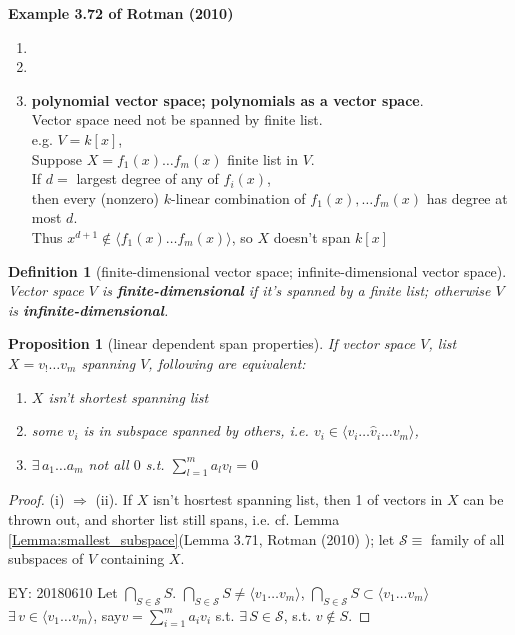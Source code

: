 \documentclass[10pt]{amsart}
\newtheorem{proposition}{Proposition}
\newtheorem{definition}{Definition}
\begin{document}
\begin{multicols*}{2}
\textbf{Example 3.72 of Rotman (2010) \cite{JRotman2010}}
\begin{enumerate}
	\item[(i)]
	\item[(ii)]
	\item[(iii)] \textbf{polynomial vector space; polynomials as a vector space}.  \\
	Vector space need not be spanned by finite list. \\
	e.g. $V=k[x]$, \\
	Suppose $X= f_1(x) \dots f_m(x)$ finite list in $V$. \\
	If $d= $ largest degree of any of $f_i(x)$, \\
	then every (nonzero) $k$-linear combination of $f_1(x), \dots f_m(x)$ has degree at most $d$. \\
	Thus $x^{d+1} \notin \langle f_1(x) \dots f_m(x) \rangle$, so $X$ doesn't span $k[x]$
\end{enumerate}

\begin{definition}[finite-dimensional vector space; infinite-dimensional vector space]
	Vector space $V$ is \textbf{finite-dimensional} if it's spanned by a finite list; otherwise $V$ is \textbf{infinite-dimensional}.
\end{definition}

\begin{proposition}[linear dependent span properties]
If vector space $V$, list $X=v_! \dots v_m$ spanning $V$, following are equivalent:
	\begin{enumerate}
		\item[(i)] $X$ isn't shortest spanning list 
		\item[(ii)] some $v_i$ is in subspace spanned by others, i.e. $v_i \in \langle v_i \dots \widehat{v}_i \dots v_m \rangle$, 
		\item[(iii)]		$\exists \, a_1 \dots a_m$ not all $0$ s.t. $\sum_{l=1}^m a_l v_l = 0$
	\end{enumerate}
\end{proposition}

\begin{proof}
(i) $\Longrightarrow$ (ii). If $X$ isn't hosrtest spanning list, then 1 of vectors in $X$ can be thrown out, and shorter list still spans, i.e. cf. Lemma \ref{Lemma:smallest_subspace}(Lemma 3.71, Rotman (2010) \cite{JRotman2010}); let $\mathcal{S} \equiv $ family of all subspaces of $V$ containing $X$. 

EY: 20180610 
Let $\bigcap_{S\in \mathcal{S}} S$. $\bigcap_{S \in \mathcal{S}} S \neq \langle v_1 \dots v_m \rangle$, $\bigcap_{S \in \mathcal{S}} S \subset \langle v_1 \dots v_m \rangle$ \\
$\exists \, v \in \langle v_1 \dots v_m \rangle$, say$v= \sum_{i=1}^m a_i v_i$ s.t. $\exists \, S \in \mathcal{S}$, s.t. $v\notin S$.  


\end{proof}
\end{multicols*}
\end{document}
